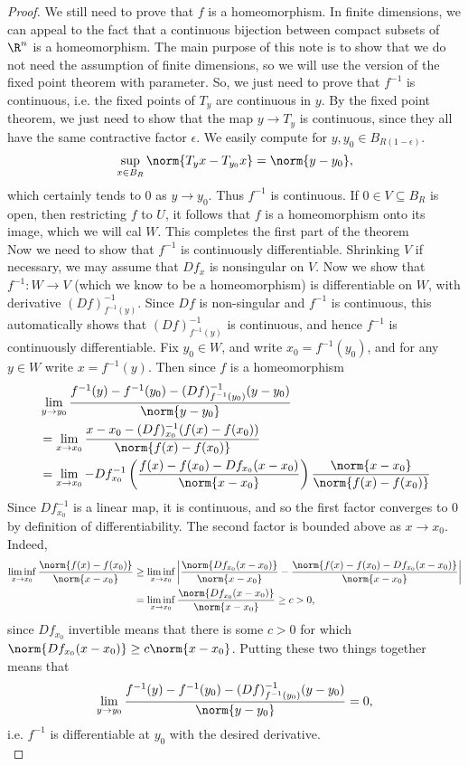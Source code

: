\documentclass[12pt]{article}
\begin{document}
\begin{proof}
We still need to prove that $f$ is a homeomorphism. In finite dimensions, we can appeal to the fact that a continuous bijection between compact subsets of $\R^n$ is a homeomorphism. The main purpose of this note is to show that we do not need the assumption of finite dimensions, so we will use the version of the fixed point theorem with parameter. So, we just need to prove that $f^{-1}$ is continuous, i.e. the fixed points of $T_y$ are continuous in $y$. By the fixed point theorem, we just need to show that the map $y \to T_y$ is continuous, since they all have the same contractive factor $\epsilon$. We easily compute for $y,y_0 \in B_{R(1-\epsilon)}$.
\[\sup_{x \in B_R} \norm{T_yx-T_{y_0}x} = \norm{y-y_0},\] which certainly tends to $0$ as $y \to y_0$. Thus $f^{-1}$ is continuous. If $0 \in V \subseteq B_R$ is open, then restricting $f$ to $U$, it follows that $f$ is a homeomorphism onto its image, which we will cal $W$. This completes the first part of the theorem\\[1.5ex]

Now we need to show that $f^{-1}$ is continuously differentiable. Shrinking $V$ if necessary, we may assume that $Df_x$ is nonsingular on $V$. Now we show that $f^{-1}:W\to V$ (which we know to be a homeomorphism) is differentiable on $W$, with derivative $(Df)^{-1}_{f^{-1}(y)}$. Since $Df$ is non-singular and $f^{-1}$ is continuous, this automatically shows that $(Df)^{-1}_{f^{-1}(y)}$ is continuous, and hence $f^{-1}$ is continuously differentiable. Fix $y_0 \in W$, and write $x_0 = f^{-1}(y_0)$, and for any $y \in W$ write $x = f^{-1}(y)$. Then since $f$ is a homeomorphism
\begin{align*}
&\lim_{y \to y_0}\frac{f^{-1}(y)-f^{-1}(y_0)-(Df)^{-1}_{f^{-1}(y_0)}(y-y_0)}{\norm{y-y_0}}\\
&=\lim_{x\to x_0}\frac{x-x_0-(Df)^{-1}_{x_0}(f(x)-f(x_0))}{\norm{f(x)-f(x_0)}}\\
&= \lim_{x\to x_0}-Df^{-1}_{x_0}\left(\frac{f(x)-f(x_0)-Df_{x_0}(x-x_0)}{\norm{x-x_0}}\right)\frac{\norm{x-x_0}}{\norm{f(x)-f(x_0)}}\end{align*}
Since $Df_{x_0}^{-1}$ is a linear map, it is continuous, and so the first factor converges to $0$ by definition of differentiability. The second factor is bounded above as $x \to x_0$. Indeed,
\begin{align*}\liminf_{x\to x_0}\frac{\norm{f(x)-f(x_0)}}{\norm{x-x_0}} &\geq \liminf_{x\to x_0}\left|\frac{\norm{Df_{x_0}(x-x_0)}}{\norm{x-x_0}}-\frac{\norm{f(x)-f(x_0)-Df_{x_0}(x-x_0)}}{\norm{x-x_0}}\right|\\
&= \liminf_{x\to x_0} \frac{\norm{Df_{x_0}(x-x_0)}}{\norm{x-x_0}} \geq c > 0,\end{align*}
since $Df_{x_0}$ invertible means that there is some $c>0$ for which $\norm{Df_{x_0}(x-x_0)} \geq c\norm{x-x_0}$. Putting these two things together means that  
\[\lim_{y \to y_0}\frac{f^{-1}(y)-f^{-1}(y_0)-(Df)^{-1}_{f^{-1}(y_0)}(y-y_0)}{\norm{y-y_0}} = 0,\]
i.e. $f^{-1}$ is differentiable at $y_0$ with the desired derivative.\\[1.5ex]


\end{proof}
\end{document}
